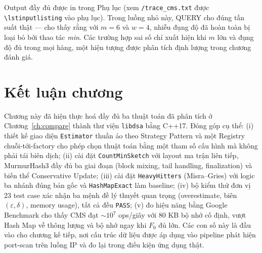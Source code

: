 Output đầy đủ được in trong Phụ lục (xem \texttt{\outputDir/trace\_cms.txt} được \texttt{\textbackslash lstinputlisting} vào phụ lục). Trong luồng nhỏ này, QUERY cho đúng tần suất thật --- cho thấy rằng với $m = 6$ và $w = 4$, nhiễu đụng độ đã hoàn toàn bị loại bỏ bởi thao tác \textit{min}. Các trường hợp sai số chỉ xuất hiện khi $m$ lớn và đụng độ đủ trong mọi hàng, một hiện tượng được phân tích định lượng trong chương đánh giá.

\section{Kết luận chương}

Chương này đã hiện thực hoá đầy đủ ba thuật toán đã phân tích ở Chương~\ref{ch:compare} thành thư viện \texttt{libdsa} bằng C++17. Đóng góp cụ thể: (i) thiết kế giao diện \texttt{Estimator} thuần ảo theo Strategy Pattern và một Registry chuỗi-tới-factory cho phép chọn thuật toán bằng một tham số cấu hình mà không phải tái biên dịch; (ii) cài đặt \texttt{CountMinSketch} với layout ma trận liên tiếp, MurmurHash3 đầy đủ ba giai đoạn (block mixing, tail handling, finalization) và biến thể Conservative Update; (iii) cài đặt \texttt{HeavyHitters} (Misra--Gries) với logic ba nhánh đúng bản gốc và \texttt{HashMapExact} làm baseline; (iv) bộ kiểm thử đơn vị 23 test case xác nhận ba mệnh đề lý thuyết quan trọng (overestimate, biên $(\varepsilon, \delta)$, memory usage), tất cả đều \texttt{PASS}; (v) đo hiệu năng bằng Google Benchmark cho thấy CMS đạt $\sim 10^7$ ops/giây với $80$ KB bộ nhớ cố định, vượt Hash Map về thông lượng và bộ nhớ ngay khi $F_0$ đủ lớn. Các con số này là đầu vào cho chương kế tiếp, nơi cấu trúc dữ liệu được áp dụng vào pipeline phát hiện port-scan trên luồng IP và đo lại trong điều kiện ứng dụng thật.
